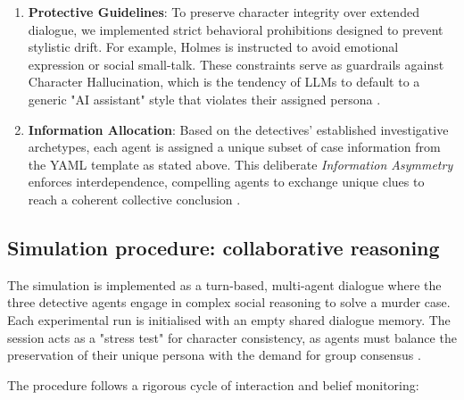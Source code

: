 \documentclass{article}
\begin{document}
\begin{enumerate}
    \item \textbf{Protective Guidelines}: To preserve character integrity over extended dialogue, we implemented strict behavioral prohibitions designed to prevent stylistic drift. For example, Holmes is instructed to avoid emotional expression or social small-talk. These constraints serve as guardrails against Character Hallucination, which is the tendency of LLMs to default to a generic "AI assistant" style that violates their assigned persona \citep{shao2023characterllm, chen2024review}.

    \item \textbf{Information Allocation}: Based on the detectives' established investigative archetypes, each agent is assigned a unique subset of case information from the YAML template as stated above. This deliberate \textit{Information Asymmetry} enforces interdependence, compelling agents to exchange unique clues to reach a coherent collective conclusion \citep{zhu2024player}.
\end{enumerate}

\subsection{Simulation procedure: collaborative reasoning}

The simulation is implemented as a turn-based, multi-agent dialogue where the three detective agents engage in complex social reasoning to solve a murder case. Each experimental run is initialised with an empty shared dialogue memory. The session acts as a "stress test" for character consistency, as agents must balance the preservation of their unique persona with the demand for group consensus \citep{chen2024socialbench}. 

The procedure follows a rigorous cycle of interaction and belief monitoring:
\end{document}
